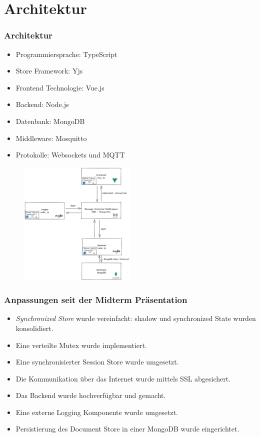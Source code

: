 \section{Architektur}
\begin{frame}
    \frametitle{Architektur}
    \begin{minipage}{0.48\textwidth}
        \begin{itemize}
            \item Programmiersprache: TypeScript
            \item Store Framework: Yjs
            \item Frontend Technologie: Vue.js
            \item Backend: Node.js
            \item Datenbank: MongoDB
            \item Middleware: Mosquitto
            \item Protokolle: Websockets und MQTT
        \end{itemize}
    \end{minipage}
    \hfill
    \begin{minipage}{0.45\textwidth}
        \begin{figure}
            \centering
            \includegraphics[height=6cm]{media/Big_Picture_wodss}
        \end{figure}
    \end{minipage}
\end{frame}
\begin{frame}
    \frametitle{Anpassungen seit der Midterm Präsentation}
    \begin{itemize}
        \item \textit{Synchronized Store} wurde vereinfacht: shadow und synchronized State wurden konsolidiert.
        \item Eine verteilte Mutex wurde implementiert.
        \item Eine synchronisierter Session Store wurde umgesetzt.
        \item Die Kommunikation über das Internet wurde mittels SSL abgesichert.
        \item Das Backend wurde hochverfügbar und gemacht.
        \item Eine externe Logging Komponente wurde umgesetzt.
        \item Persistierung des Document Store in einer MongoDB wurde eingerichtet.
    \end{itemize}
\end{frame}
